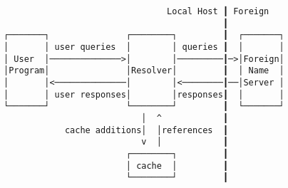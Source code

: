 \documentclass[varwidth=30cm,crop]{standalone}
\begin{document}
\begin{verbatim}
                                Local Host ┃ Foreign
                                           ┃
┌───────┐               ┌────────┐         ┃  ┌───────┐
│       │ user queries  │        │ queries ┃  │       │
│ User  │──────────────>│        │─────────┃─>│Foreign│
│Program│               │Resolver│         ┃  │ Name  │
│       │<──────────────│        │<────────┃──│Server │
│       │ user responses│        │responses┃  │       │
└───────┘               └────────┘         ┃  └───────┘
                           │  ^            ┃
            cache additions│  │references  ┃
                           v  │            ┃
                        ┌────────┐         ┃
                        │ cache  │         ┃
                        └────────┘         ┃
\end{verbatim}
\end{document}
